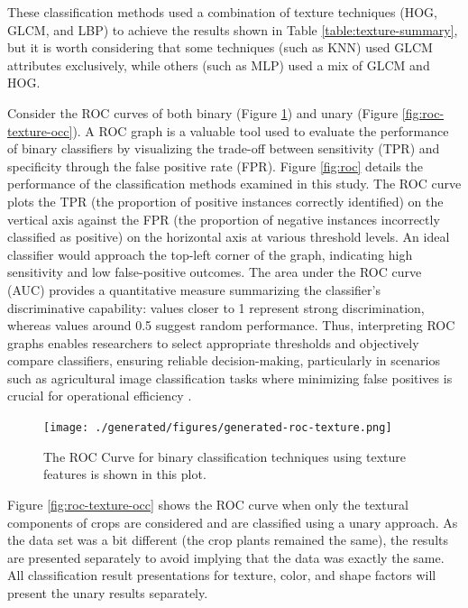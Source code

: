 \documentclass[letterpaper, notitlepage]{report}
\begin{document}
These classification methods used a combination of texture techniques (\gls{HOG}, \gls{GLCM}, and \gls{LBP}) to achieve the results shown in Table  \ref{table:texture-summary}, but it is worth considering that some techniques (such as \gls{KNN}) used \gls{GLCM} attributes exclusively, while others (such as \gls{MLP}) used a mix of \gls{GLCM} and \gls{HOG}.  

{

}

Consider the \gls{ROC} curves of both binary (Figure \ref{fig:roc-texture}) and unary (Figure \ref{fig:roc-texture-occ}). A \gls{ROC} graph is a valuable tool used to evaluate the performance of binary classifiers by visualizing the trade-off between sensitivity (\gls{TPR}) and specificity through the false positive rate (FPR). Figure \ref{fig:roc} details the performance of the classification methods examined in this study. The \gls{ROC} curve plots the TPR (the proportion of positive instances correctly identified) on the vertical axis against the FPR (the proportion of negative instances incorrectly classified as positive) on the horizontal axis at various threshold levels. An ideal classifier would approach the top-left corner of the graph, indicating high sensitivity and low false-positive outcomes. The area under the ROC curve (AUC) provides a quantitative measure summarizing the classifier’s discriminative capability: values closer to 1 represent strong discrimination, whereas values around 0.5 suggest random performance. Thus, interpreting \gls{ROC} graphs enables researchers to select appropriate thresholds and objectively compare classifiers, ensuring reliable decision-making, particularly in scenarios such as agricultural image classification tasks where minimizing false positives is crucial for operational efficiency \parencite{Fawcett2006-zx}. 

\begin{figure}[H]
	\centering
	\texttt{[image: ./generated/figures/generated-roc-texture.png]}
	\caption[ROC Curve for binary classification using texture features]{The ROC Curve for binary classification techniques using texture features is shown in this plot.}
	\label{fig:roc-texture}
\end{figure}

Figure \ref{fig:roc-texture-occ} shows the \gls{ROC} curve when only the textural components of crops are considered and are classified using a unary approach. As the data set was a bit different (the crop plants remained the same), the results are presented separately to avoid implying that the data was exactly the same. All classification result presentations for texture, color, and shape factors will present the unary results separately.
\end{document}
